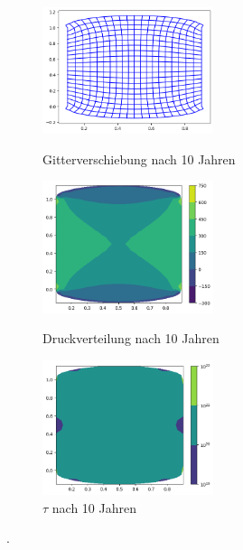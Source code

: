 \documentclass[12pt]{article}
\begin{document}
\begin{figure}[H]
	\begin{minipage}[hbt]{0.25\textwidth}
		\centering
		\includegraphics[width=5cm]{A1_Gitterverschiebung.png}
		\caption{Gitterverschiebung nach 10 Jahren}
		\label{Bild1}
	\end{minipage}
	\hfill
	\begin{minipage}[hbt]{0.25\textwidth}
		\centering
		\includegraphics[width=5cm]{A1_Druck.png}
		\caption{Druckverteilung nach 10 Jahren}
		\label{Bild2}
	\end{minipage}
\hfill
	\begin{minipage}[hbt]{0.25\textwidth}
	\centering
	\includegraphics[width=5cm]{A1_tau2nd.png}
	\caption{$\tau$ nach 10 Jahren}
	\label{Bild2}
\end{minipage}
\end{figure}
.
\end{document}
